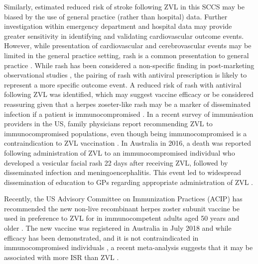 \documentclass[review, endfloat]{elsarticle}
\begin{document}
Similarly, estimated reduced risk of stroke following ZVL in this SCCS may be biased by the use of general practice (rather than hospital) data. Further investigation within emergency department and hospital data may provide greater sensitivity in identifying and validating cardiovascular outcome events. However, while presentation of cardiovascular and cerebrovascular events may be limited in the general practice setting, rash is a common presentation to general practice \citep{ely2010}. While rash has been considered a non-specific finding in post-marketing observational studies \citep{tseng2012}, the pairing of rash with antiviral prescription is likely to represent a more specific outcome event. A reduced risk of rash with antiviral following ZVL was identified, which may suggest vaccine efficacy or be considered reassuring given that a herpes zoseter-like rash may be a marker of disseminated infection if a patient is immunocompromised \citep{alexander2018}. In a recent survey of immunisation providers in the US, family physicians report recommending ZVL to immunocompromised populations, even though being immunocompromised is a contraindication to ZVL vaccination \citep{hurley2018}. In Australia in 2016, a death was reported following administration of ZVL to an immunocompromised individual who developed a vesicular facial rash 22 days after receiving ZVL, followed by disseminated infection and meningoencephalitis\citep{alexander2018}. This event led to widespread dissemination of education to GPs regarding appropriate administration of ZVL \citep{tgazos}.

Recently, the US Advisory Committee on Immunization Practices (ACIP) has recommended the new non-live recombinant herpes zoster subunit vaccine be used in preference to ZVL for in immunocompetent adults aged 50 years and older \citep{dooling2018}. The new vaccine was registered in Australia in July 2018 and while efficacy has been demonstrated, and it is not contraindicated in immunocompromised individuals \citep{hurley2018}, a recent meta-analysis suggests that it may be associated with more ISR than ZVL \citep{tricco2018}.
\end{document}

